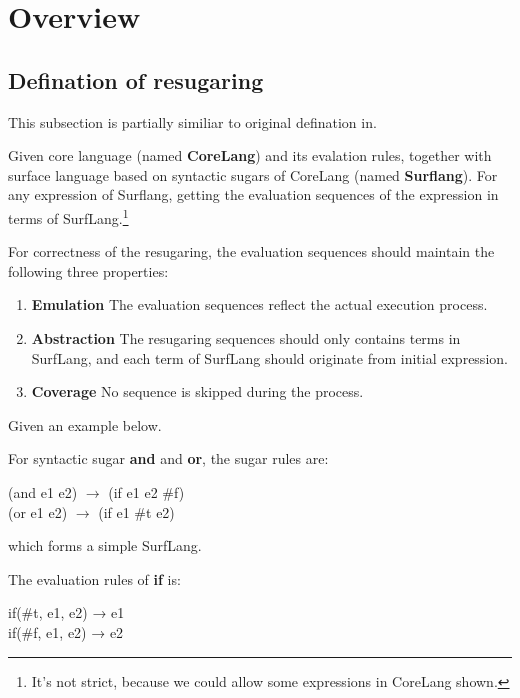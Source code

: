 \section{Overview}
\label{sec2}

\subsection{Defination of resugaring}
This subsection is partially similiar to original defination in\cite{resugaring}.
\begin{Def}[Resugaring]
Given core language (named {\bfseries CoreLang}) and its evalation rules, together with surface language based on syntactic sugars of CoreLang (named {\bfseries Surflang}). For any expression of Surflang, getting the evaluation sequences of the expression in terms of SurfLang.\footnote{It's not strict, because we could allow some expressions in CoreLang shown.}
\end{Def}
For correctness of the resugaring, the evaluation sequences should maintain the following three properties:
\begin{enumerate}
\item {\bfseries Emulation} The evaluation sequences reflect the actual execution process.
\item {\bfseries Abstraction} The resugaring sequences should only contains terms in SurfLang, and each term of SurfLang should originate from initial expression.
\item {\bfseries Coverage} No sequence is skipped during the process.
\end{enumerate}

Given an example below.

For syntactic sugar {\bfseries and} and {\bfseries or}, the sugar rules are:

\begin{center}
	\parbox[t]{\textwidth}{%
		\begin{flushleft}  
			(and e1 e2) $\rightarrow$ (if e1 e2 \#f)\\
			(or e1 e2) $\rightarrow$ (if e1 \#t e2)
		\end{flushleft}  
	}%
\end{center}
which forms a simple SurfLang.

The evaluation rules of {\bfseries if} is:
\begin{center}
	\parbox[t]{\textwidth}{%
		\begin{center}  
			if(\#t, e1, e2) → e1\\
			if(\#f, e1, e2) → e2
		\end{center}  
	}%
\end{center}

